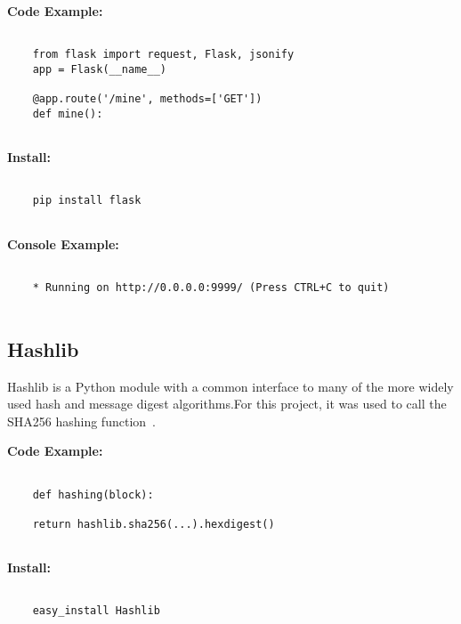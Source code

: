 \bigskip
\noindent
\textbf{Code Example:}
\begin{footnotesize}
\begin{verbatim}

    from flask import request, Flask, jsonify
   	app = Flask(__name__)

    @app.route('/mine', methods=['GET'])
    def mine():
    
\end{verbatim}
\end{footnotesize}
\noindent
\textbf{Install:}
\begin{footnotesize}
\begin{verbatim}

    pip install flask
    
\end{verbatim}
\end{footnotesize}
\noindent
\textbf{Console Example:}
\begin{footnotesize}
\begin{verbatim}

    * Running on http://0.0.0.0:9999/ (Press CTRL+C to quit)
    
\end{verbatim}
\end{footnotesize}
\subsection{Hashlib}

Hashlib is a Python module with a common interface to many of the more widely used hash and 
message digest algorithms.For this project, it was used to call the SHA256 hashing function~\cite{hid-sp18-414-www-hashlib-secure}.

\bigskip
\noindent
\textbf{Code Example:}
\begin{footnotesize}
\begin{verbatim}

    def hashing(block):

    return hashlib.sha256(...).hexdigest()
    
\end{verbatim}
\end{footnotesize}
\noindent
\textbf{Install:}
\begin{footnotesize}
\begin{verbatim}

    easy_install Hashlib
    
\end{verbatim}
\end{footnotesize}


